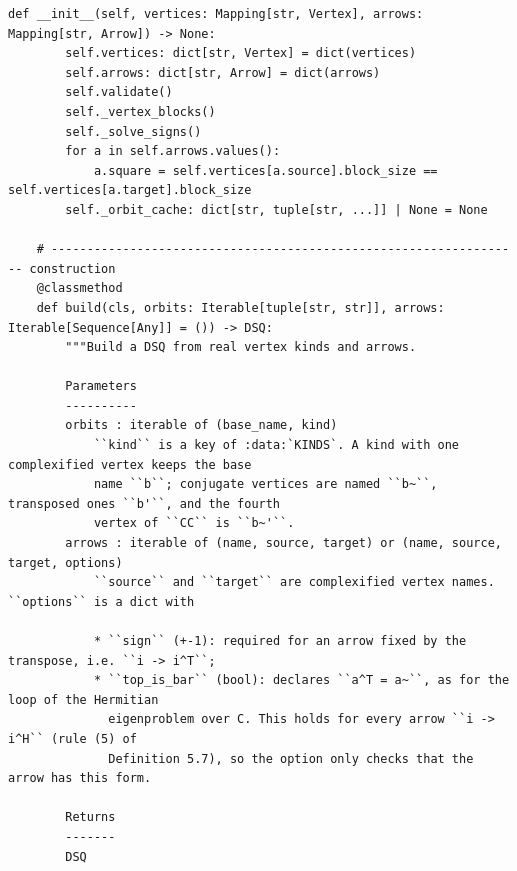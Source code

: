 \documentclass[12pt, a4paper]{report}
\theoremstyle{plain}
\theoremstyle{definition}
\theoremstyle{remark}
\theoremstyle{plain}
\begin{document}
\begin{lstlisting}[style=dsqcode]
    def __init__(self, vertices: Mapping[str, Vertex], arrows: Mapping[str, Arrow]) -> None:
        self.vertices: dict[str, Vertex] = dict(vertices)
        self.arrows: dict[str, Arrow] = dict(arrows)
        self.validate()
        self._vertex_blocks()
        self._solve_signs()
        for a in self.arrows.values():
            a.square = self.vertices[a.source].block_size == self.vertices[a.target].block_size
        self._orbit_cache: dict[str, tuple[str, ...]] | None = None

    # ------------------------------------------------------------------ construction
    @classmethod
    def build(cls, orbits: Iterable[tuple[str, str]], arrows: Iterable[Sequence[Any]] = ()) -> DSQ:
        """Build a DSQ from real vertex kinds and arrows.

        Parameters
        ----------
        orbits : iterable of (base_name, kind)
            ``kind`` is a key of :data:`KINDS`. A kind with one complexified vertex keeps the base
            name ``b``; conjugate vertices are named ``b~``, transposed ones ``b'``, and the fourth
            vertex of ``CC`` is ``b~'``.
        arrows : iterable of (name, source, target) or (name, source, target, options)
            ``source`` and ``target`` are complexified vertex names. ``options`` is a dict with

            * ``sign`` (+-1): required for an arrow fixed by the transpose, i.e. ``i -> i^T``;
            * ``top_is_bar`` (bool): declares ``a^T = a~``, as for the loop of the Hermitian
              eigenproblem over C. This holds for every arrow ``i -> i^H`` (rule (5) of
              Definition 5.7), so the option only checks that the arrow has this form.

        Returns
        -------
        DSQ


\end{lstlisting}
\end{document}
